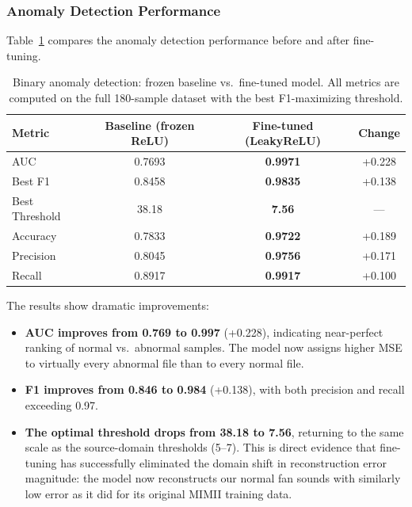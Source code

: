 \documentclass[12pt, a4paper]{article}
\begin{document}
\subsubsection{Anomaly Detection Performance}

Table~\ref{tab:finetune-comparison} compares the anomaly detection performance before and after fine-tuning.

\begin{table}[htbp]
\centering
\caption{Binary anomaly detection: frozen baseline vs.\ fine-tuned model. All metrics are computed on the full 180-sample dataset with the best F1-maximizing threshold.}
\label{tab:finetune-comparison}
\begin{tabular}{lccc}
\toprule
Metric & Baseline (frozen ReLU) & Fine-tuned (LeakyReLU) & Change \\
\midrule
AUC                & 0.7693 & \textbf{0.9971} & +0.228 \\
Best F1            & 0.8458 & \textbf{0.9835} & +0.138 \\
Best Threshold     & 38.18  & \textbf{7.56}   & --- \\
Accuracy           & 0.7833 & \textbf{0.9722} & +0.189 \\
Precision          & 0.8045 & \textbf{0.9756} & +0.171 \\
Recall             & 0.8917 & \textbf{0.9917} & +0.100 \\
\bottomrule
\end{tabular}
\end{table}

The results show dramatic improvements:

\begin{itemize}
    \item \textbf{AUC improves from 0.769 to 0.997} (+0.228), indicating near-perfect ranking of normal vs.\ abnormal samples. The model now assigns higher MSE to virtually every abnormal file than to every normal file.
    \item \textbf{F1 improves from 0.846 to 0.984} (+0.138), with both precision and recall exceeding 0.97.
    \item \textbf{The optimal threshold drops from 38.18 to 7.56}, returning to the same scale as the source-domain thresholds (5--7). This is direct evidence that fine-tuning has successfully eliminated the domain shift in reconstruction error magnitude: the model now reconstructs our normal fan sounds with similarly low error as it did for its original MIMII training data.
\end{itemize}
\end{document}
